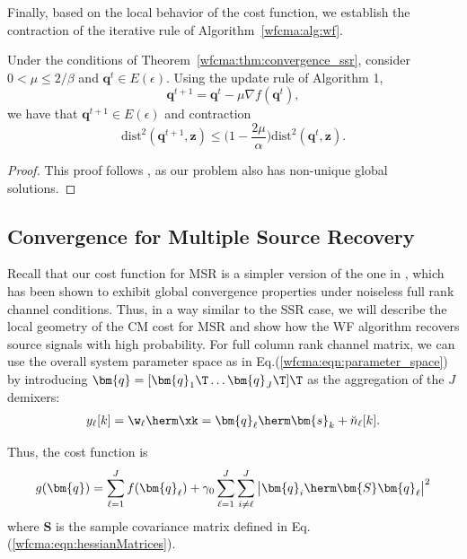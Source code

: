 Finally, based on the local behavior of the cost function, we establish the contraction of the iterative rule of Algorithm~\ref{wfcma:alg:wf}.
\begin{lem} \label{wfcma:lemma:contraction_ssr}
Under the conditions of Theorem~\ref{wfcma:thm:convergence_ssr}, consider $0 < \mu \leq 2/\beta$ and $\bm{q}^{t}\in E(\epsilon)$. Using the update rule of Algorithm 1,
\begin{equation}
	\bm{q}^{t+1} = \bm{q}^t - \mu\nabla f(\bm{q}^t),
\end{equation}
we have that $\bm{q}^{t+1}\in E(\epsilon)$ and contraction
\begin{equation}
	\mathrm{dist}^2	(\bm{q}^{t+1} ,\bm{z}) \leq \Big(1 -\frac{2\mu}{\alpha}\Big) \mathrm{dist}^2	(\bm{q}^t,\bm{z}). \label{wfcma:eqn:distance_convergence_rule_ssr}
\end{equation}
\end{lem} 
\begin{proof}
This proof follows \cite[Lemma 7.10]{Candes2015a_phaseretrievalWF}, as our problem also has non-unique global solutions.
\end{proof}


\subsection{Convergence for Multiple Source Recovery} \label{wfcma:Analysis_MSR}

Recall that our cost function for MSR is a simpler version of the one in \cite{Li1998adaptivemimocma}, which has been shown to exhibit global convergence properties under noiseless full rank channel conditions. 
Thus, in a way similar to the SSR case, we will describe the local geometry of the CM cost for MSR and show how the WF algorithm recovers source signals with high probability. 
For full column rank  channel matrix, we can use the overall system parameter space as in 
Eq.(\ref{wfcma:eqn:parameter_space})
by introducing $\bm{q}=[\bm{q}_1\T \ldots \bm{q}_J\T]\T$ as the aggregation of the $J$ demixers:
\begin{align}
y_{\ell}[k]=\w_{\ell}\herm\xk=\bm{q}_{\ell}\herm\bm{s}_k+\breve{n}_{\ell}[k].
\end{align}

Thus, the cost function is
\begin{align}
g(\bm{q})=\sum_{{\ell}=1}^J f(\bm{q}_{\ell}) +\gamma_0\sum_{{\ell}=1}^J\sum_{i\neq {\ell}}^J\big|\bm{q}_{i}\herm\bm{S}\bm{q}_{\ell}\big|^2 \label{wfcma:eqn:cma_msr_qspace}
\end{align}
where $\bm{S}$ is the sample covariance matrix defined in Eq.(\ref{wfcma:eqn:hessianMatrices}). 

